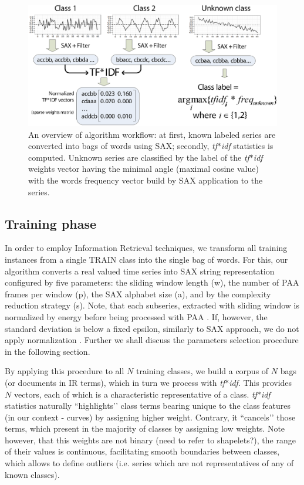 \documentclass{llncs}
\begin{document}
\begin{figure}[H]
   \centering
   \includegraphics[width=120mm]{figures/overview.eps}
   \caption{An overview of algorithm workflow: at first, known labeled series are converted into
bags of words using SAX; secondly, \textit{tf$\ast$idf} statistics is computed. Unknown series are
classified by the label of the \textit{tf$\ast$idf} weights vector having the minimal angle (maximal
cosine value) with the words frequency vector build by SAX application to the series.}
   \label{fig:overview}
\end{figure}

\subsection{Training phase}
In order to employ Information Retrieval techniques, we transform all training instances from a
single TRAIN class into the single bag of words. For this, our algorithm converts a real valued time
series into SAX string representation configured by five parameters: the sliding window length (w),
the number of PAA frames per window (p), the SAX alphabet size (a), and by the complexity reduction
strategy (s). Note, that each subseries, extracted with sliding window is normalized by energy
before being processed with PAA \cite{goldin_kanellakis}. If, however, the standard deviation is
below a fixed epsilon, similarly to SAX approach, we do not apply normalization
\cite{sax}. Further we shall discuss the parameters selection procedure in the following section.

By applying this procedure to all $N$ training classes, we build a corpus of $N$ bags (or documents in
IR terms), which in turn we process with \textit{tf$\ast$idf}. This provides $N$ vectors, each of
which is a characteristic representative of a class. \textit{tf$\ast$idf} statistics naturally
``highlights’’ class terms bearing unique to the class features (in our context - curves) by
assigning higher weight. Contrary, it ``cancels’’ those terms, which present in the majority of
classes by assigning low weights. Note however, that this weights are not binary (need to refer to
shapelets?), the range of their values is continuous, facilitating smooth boundaries between
classes, which allows to define outliers (i.e. series which are not representatives of any of known
classes).
\end{document}
